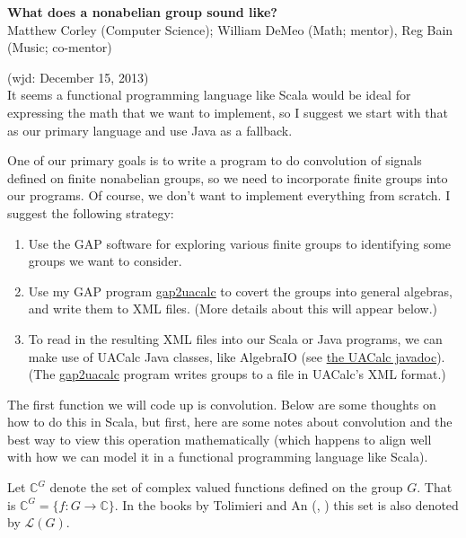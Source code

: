 \documentclass{article}
\newcommand\C{\ensuremath{\mathbb{C}}}
\newcommand\sL{\ensuremath{\mathcal{L}}}
\begin{document}
\begin{center}
{\bf What does a nonabelian group sound like?}\\
Matthew Corley (Computer Science); William DeMeo (Math; mentor), Reg
Bain (Music; co-mentor)
\end{center}

  (wjd: December 15, 2013)\\[5pt]
It seems a functional programming language like Scala would be ideal
for expressing the math that we want to implement, so I suggest we
start with that as our primary language and use Java as a fallback. 

One of our primary goals is to write a program to do convolution of signals
defined on finite nonabelian groups, so we need to incorporate finite
groups into our programs.  Of course, we don't want to 
implement everything from scratch.  I suggest the following strategy:
\begin{enumerate}
\item Use the \acs{GAP} software for exploring various finite groups to
  identifying some groups we want to consider.
\item Use my \acs{GAP} program
  \href{http://universalalgebra.wordpress.com/documentation/gap/gap-and-uacalc/}{gap2uacalc}
  to covert the groups into general algebras, and write them to \acs{XML}
  files. (More details about this will appear below.)
\item To read in the resulting \acs{XML} files into our Scala or Java programs,
  we can make use of UACalc Java classes, like AlgebraIO 
  (see \href{http://uacalc.org/doc/}{the UACalc javadoc}). (The
  \href{http://universalalgebra.wordpress.com/documentation/gap/gap-and-uacalc/}{gap2uacalc}
  program writes groups to a file in UACalc's \acs{XML} format.)
\end{enumerate}

The first function we will code up is convolution.  Below are some thoughts on
how to do this in Scala, but first, here are some notes about convolution and
the best way to view this operation mathematically (which happens to align well
with how we can model it in a functional programming language like Scala).

Let $\C^G$ denote the set of complex valued functions defined on the group
$G$.  That is $\C^G = \{f : G\rightarrow \C \}$.  In the books by Tolimieri and
An (\cite{Tolimieri:1998}, \cite{Tolimieri:2003}) this set is also denoted by
$\sL(G)$. 
\end{document}
